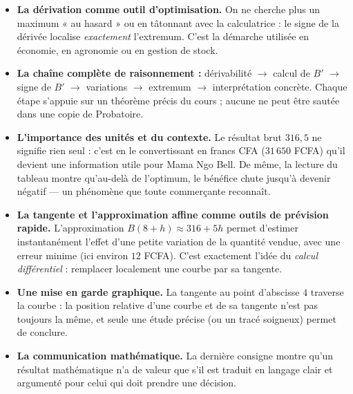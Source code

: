\documentclass[11pt]{article}
\begin{document}
\begin{itemize}
\item \textbf{La dérivation comme outil d'optimisation.} On ne cherche plus un maximum « au hasard » ou en tâtonnant avec la calculatrice : le signe de la dérivée localise \emph{exactement} l'extremum. C'est la démarche utilisée en économie, en agronomie ou en gestion de stock.
\item \textbf{La chaîne complète de raisonnement :} dérivabilité $\rightarrow$ calcul de $B'$ $\rightarrow$ signe de $B'$ $\rightarrow$ variations $\rightarrow$ extremum $\rightarrow$ interprétation concrète. Chaque étape s'appuie sur un théorème précis du cours ; aucune ne peut être sautée dans une copie de Probatoire.
\item \textbf{L'importance des unités et du contexte.} Le résultat brut $316{,}5$ ne signifie rien seul : c'est en le convertissant en francs CFA ($31\,650$ FCFA) qu'il devient une information utile pour Mama Ngo Bell. De même, la lecture du tableau montre qu'au-delà de l'optimum, le bénéfice chute jusqu'à devenir négatif — un phénomène que toute commerçante reconnaît.
\item \textbf{La tangente et l'approximation affine comme outils de prévision rapide.} L'approximation $B(8+h) \approx 316 + 5h$ permet d'estimer instantanément l'effet d'une petite variation de la quantité vendue, avec une erreur minime (ici environ $12$ FCFA). C'est exactement l'idée du \emph{calcul différentiel} : remplacer localement une courbe par sa tangente.
\item \textbf{Une mise en garde graphique.} La tangente au point d'abscisse $4$ traverse la courbe : la position relative d'une courbe et de sa tangente n'est pas toujours la même, et seule une étude précise (ou un tracé soigneux) permet de conclure.
\item \textbf{La communication mathématique.} La dernière consigne montre qu'un résultat mathématique n'a de valeur que s'il est traduit en langage clair et argumenté pour celui qui doit prendre une décision.
\end{itemize}
\end{document}

